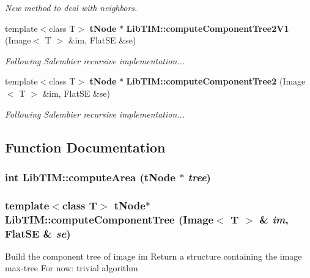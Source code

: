 \begin{CompactItemize}
\begin{CompactList}\small\item\em New method to deal with neighbors. \item\end{CompactList}\item 
template$<$class T$>$ {\bf t\-Node} $\ast$ {\bf Lib\-TIM::compute\-Component\-Tree2V1} (Image$<$ T $>$ \&im, Flat\-SE \&se)
\begin{CompactList}\small\item\em Following Salembier recursive implementation... \item\end{CompactList}\item 
template$<$class T$>$ {\bf t\-Node} $\ast$ {\bf Lib\-TIM::compute\-Component\-Tree2} (Image$<$ T $>$ \&im, Flat\-SE \&se)
\begin{CompactList}\small\item\em Following Salembier recursive implementation... \item\end{CompactList}\end{CompactItemize}


\subsection{Function Documentation}
\subsubsection{\setlength{\rightskip}{0pt plus 5cm}int Lib\-TIM::compute\-Area ({\bf t\-Node} $\ast$ {\em tree})}\label{group__ccTree_ga9}


\subsubsection{\setlength{\rightskip}{0pt plus 5cm}template$<$class T$>$ {\bf t\-Node}$\ast$ Lib\-TIM::compute\-Component\-Tree (Image$<$ T $>$ \& {\em im}, Flat\-SE \& {\em se})}\label{group__ccTree_ga5}


Build the component tree of image im Return a structure containing the image max-tree For now: trivial algorithm 
